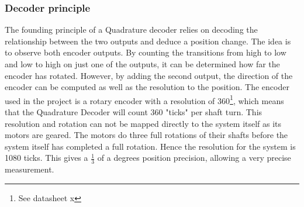 \documentclass[../../../main]{subfiles}
\begin{document}
\subsubsection{Decoder principle}
The founding principle of a Quadrature decoder relies on decoding the relationship between the two outputs and deduce a position change. The idea is to observe both encoder outputs. By counting the transitions from high to low and low to high on just one of the outputs, it can be determined how far the encoder has rotated. However, by adding the second output, the direction of the encoder can be computed as well as the resolution to the position. The encoder used in the project is a rotary encoder with a resolution of 360\footnote{See datasheet x}, which means that the Quadrature Decoder will count 360 "ticks" per shaft turn. This resolution and rotation can not be mapped directly to the system itself as its motors are geared. The motors do three full rotations of their shafts before the system itself has completed a full rotation. Hence the resolution for the system is 1080 ticks. This gives a $\frac{1}{3}$ of a degrees position precision, allowing a very precise measurement.
\end{document}
